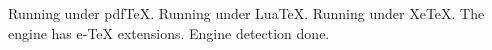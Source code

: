 \documentclass{article}
\begin{document}
\ifpdftex Running under pdf\TeX. \fi
\ifluatex Running under Lua\TeX. \fi
\ifxetex Running under Xe\TeX. \fi
\ifetex The engine has e-TeX extensions. \fi
Engine detection done.
\end{document}
